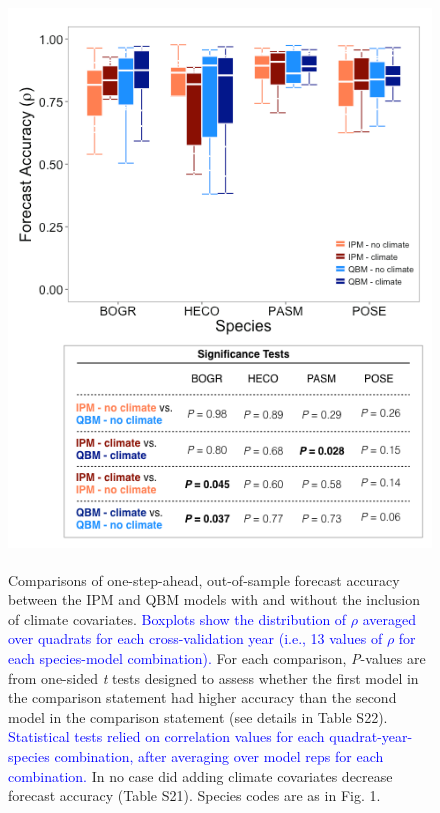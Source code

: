 \documentclass[12pt,]{article}
\begin{document}
\newpage{}

\begin{figure}[!ht]
  \centering
      \includegraphics[height=6in]{./components/forecast_accuracy_mockup_boxplot.png}
  \caption{Comparisons of one-step-ahead, out-of-sample forecast accuracy between the IPM and QBM models with and without the inclusion of climate covariates. \textcolor{blue}{Boxplots show the distribution of $\rho$ averaged over quadrats for each cross-validation year (i.e., 13 values of $\rho$ for each species-model combination).} For each comparison, \emph{P}-values are from one-sided \emph{t} tests designed to assess whether the first model in the comparison statement had higher accuracy than the second model in the comparison statement (see details in Table S22). \textcolor{blue}{Statistical tests relied on correlation values for each quadrat-year-species combination, after averaging over model reps for each combination.} In no case did adding climate covariates decrease forecast accuracy (Table S21). Species codes are as in Fig. 1.}
\end{figure}

\newpage{}
\end{document}
